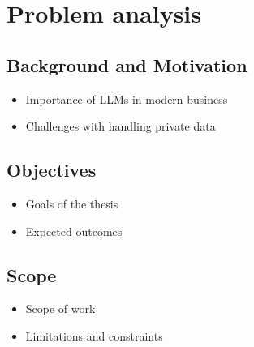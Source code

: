 \chapter{Problem analysis}

\section{Background and Motivation}
\begin{itemize}
    \item Importance of LLMs in modern business
    \item Challenges with handling private data
\end{itemize}

\section{Objectives}
\begin{itemize}
    \item Goals of the thesis
    \item Expected outcomes
\end{itemize}

\section{Scope}
\begin{itemize}
    \item Scope of work
    \item Limitations and constraints
\end{itemize}
